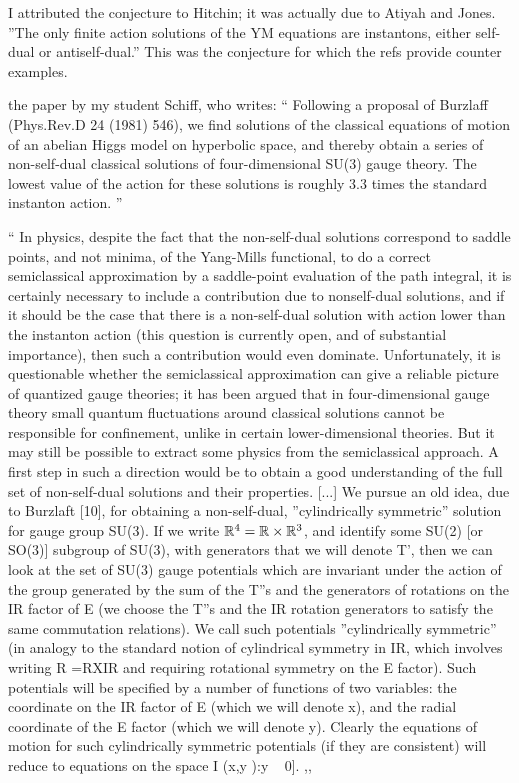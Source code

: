 \begin{description}
I attributed the conjecture to Hitchin; it was actually due to Atiyah and
Jones. ''The only finite action solutions of the YM equations are
instantons, either self-dual or antiself-dual.'' This was the conjecture
for which the refs provide counter examples.

 the paper by my
student Schiff, who writes:
``
Following a proposal of Burzlaff (Phys.Rev.D 24 (1981) 546), we find
solutions of the classical equations of motion of an abelian Higgs model
on hyperbolic space, and thereby obtain a series of non-self-dual
classical solutions of four-dimensional SU(3) gauge theory. The lowest
value of the action for these solutions is roughly 3.3 times the standard
instanton action.
''

``
In physics, despite the fact that the non-self-dual solutions correspond
to saddle points, and not minima, of the Yang-Mills functional, to do a
correct semiclassical approximation by a saddle-point evaluation of the
path integral, it is certainly necessary to include a contribution due to
nonself-dual solutions, and if it should be the case that there is a
non-self-dual solution with action lower than the instanton action (this
question is currently open, and of substantial importance), then such a
contribution would even dominate. Unfortunately, it is questionable
whether the semiclassical approximation can give a reliable picture of
quantized gauge theories; it has been argued that in four-dimensional
gauge theory small quantum fluctuations
around classical solutions cannot be responsible for
confinement, unlike in certain lower-dimensional
theories. But it may still be possible to extract some
physics from the semiclassical approach. A first step in
such a direction would be to obtain a good understanding
of the full set of non-self-dual solutions and their properties.
[...] We pursue an old idea, due to Burzlaft
[10], for obtaining a non-self-dual, ''cylindrically symmetric''
solution for gauge group SU(3). If we write
$\mathbb{R}^4 = \mathbb{R} \times \mathbb{R}^3$, and identify some SU(2) [or SO(3)] subgroup
of SU(3), with generators that we will denote T', then we
can look at the set of SU(3) gauge potentials which are invariant
under the action of the group generated by the
sum of the T''s and the generators of rotations on the IR
factor of E (we choose the T''s and the IR rotation generators
to satisfy the same commutation relations). We
call such potentials ''cylindrically symmetric'' (in analogy
to the standard notion of cylindrical symmetry in IR,
which involves writing R =RXIR and requiring rotational
symmetry on the E factor). Such potentials will
be specified by a number of functions of two variables:
the coordinate on the IR factor of E (which we will
denote x), and the radial coordinate of the E factor
(which we will denote y). Clearly the equations of motion
for such cylindrically symmetric potentials (if they are
consistent) will reduce to equations on the space
I (x,y ):y ~ 0].
,,


\end{description}
